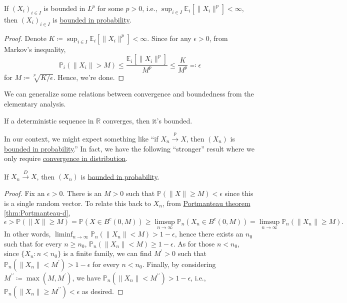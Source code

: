 \begin{proposition}\label{prop:bounded-in-Lp-bounded-in-probability}
	If \((X_i)_{i \in I}\) is bounded in \(L^p\) for some \(p > 0\), i.e., \(\sup _{i \in I} \mathbb{E}_{i}\left[\lVert X_i \rVert ^p \right] < \infty \), then \((X_i)_{i \in I}\) is \hyperref[def:bounded-in-probability]{bounded in probability}.
\end{proposition}
\begin{proof}
	Denote \(K \coloneqq \sup _{i \in I} \mathbb{E}_{i}\left[\lVert X_i \rVert ^p \right] < \infty\). Since for any \(\epsilon > 0\), from Markov's inequality,
	\[
		\mathbb{P} _{i}(\lVert X_i \rVert > M)
		\leq \frac{\mathbb{E}_{i}\left[\lVert X_i \rVert ^p \right] }{M^p}
		\leq \frac{K}{M^p}
		\eqqcolon \epsilon
	\]
	for \(M \coloneqq \sqrt[p]{K / \epsilon } \). Hence, we're done.
\end{proof}

We can generalize some relations between convergence and boundedness from the elementary analysis.

\begin{prev}
	If a deterministic sequence in \(\mathbb{R} \) converges, then it's bounded.
\end{prev}

In our context, we might expect something like ``if \(X_n \overset{p}{\to } X \), then \((X_n)\) is \hyperref[def:bounded-in-probability]{bounded in probability}.'' In fact, we have the following ``stronger'' result where we only require \hyperref[def:converge-in-distribution]{convergence in distribution}.

\begin{proposition}\label{prop:convergence-in-distirbution-bounded-in-probability}
	If \(X_n \overset{D}{\to } X\), then \((X_n)\) is \hyperref[def:bounded-in-probability]{bounded in probability}.
\end{proposition}
\begin{proof}
	Fix an \(\epsilon > 0\). There is an \(M > 0\) such that \(\mathbb{P} (\lVert X \rVert \geq M) < \epsilon \) since this is a single random vector. To relate this back to \(X_n\), from \hyperref[thm:Portmanteau]{Portmanteau theorem} \autoref{thm:Portmanteau-d},
	\[
		\epsilon
		> \mathbb{P} (\lVert X \rVert \geq M)
		= \mathbb{P} (X \in B^{c} (0, M))
		\geq \limsup_{n \to \infty} \mathbb{P} _{n}(X_n \in B^{c} (0, M))
		= \limsup_{n \to \infty} \mathbb{P} _{n}(\lVert X_n \rVert \geq M).
	\]
	In other words, \(\liminf_{n \to \infty} \mathbb{P} _{n}(\lVert X_n \rVert < M) > 1 - \epsilon\), hence there exists an \(n_0\) such that for every \(n \geq n_0\), \(\mathbb{P} _{n}(\lVert X_n \rVert < M) \geq 1 - \epsilon \). As for those \(n < n_0\), since \(\{ X_n \colon n < n_0 \} \) is a finite family, we can find \(M^{\prime} > 0\) such that \(\mathbb{P} _{n}(\lVert X_n \rVert < M^{\prime} ) > 1 - \epsilon \) for every \(n < n_0\). Finally, by considering \(M^{\prime\prime} \coloneqq \max (M, M^{\prime} )\), we have \(\mathbb{P} _{n}(\lVert X_n \rVert < M^{\prime\prime} ) > 1 - \epsilon \), i.e., \(\mathbb{P} _{n}(\lVert X_n \rVert \geq M^{\prime\prime} ) < \epsilon \) as desired.
\end{proof}

